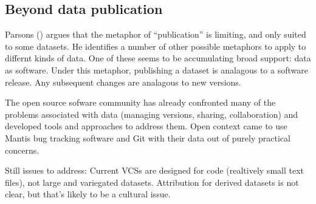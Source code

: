 \documentclass{article}
\begin{document}
\subsection{Beyond data publication}\label{beyond-data-publication}

Parsons () argues that the metaphor of ``publication'' is limiting, and only suited to some datasets.
He identifies a number of other possible metaphors to apply to differnt kinds of data.
One of these seems to be accumulating broad support: data as software. Under this metaphor, publishing a dataset is analagous to a software release. Any subsequent changes are analagous to new versions.

The open source sofware community has already confronted many of the problems associated with data (managing versions, sharing, collaboration) and developed tools and approaches to address them.
Open context came to use Mantis bug tracking software and Git with their data out of purely practical concerns.

Still issues to address: Current VCSs are designed for code (realtively small text files), not large and variegated datasets.
Attribution for derived datasets is not clear, but that's likely to be a cultural issue.



\end{document}

